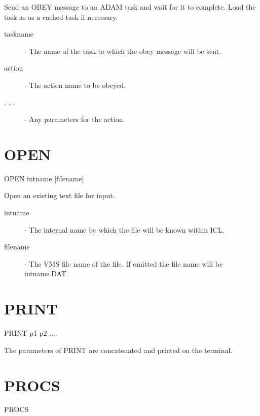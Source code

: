  Send an OBEY message to an ADAM task and wait for it to complete. Load the
 task as as a cached task if necessary.

\begin{description}

 \item[taskname] - The name of the task to which the obey message will be sent.

 \item[action] - The action name to be obeyed.

 \item[. . .] - Any parameters for the action.

\end{description}

\section{OPEN}
                                       
   OPEN \hspace{.5cm} intname \hspace{.5cm} [filename]

 Open an existing text file for input. 

\begin{description}

\item[intname]  -  The internal name by which the file will be known
                  within ICL.

\item[filename]  -  The VMS file name of the file. If omitted the
                  file name will be intname.DAT.

\end{description}

\section{PRINT}

    PRINT  \hspace{.5cm}  p1 \hspace{.5cm} p2  ....

 The parameters of PRINT are concatenated and printed on the terminal.

\section{PROCS}

    PROCS

